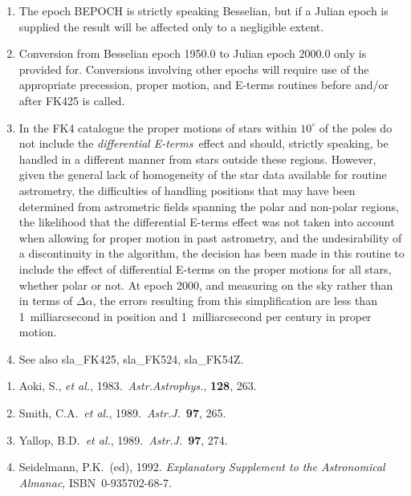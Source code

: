 {
 \begin{enumerate}
  \item The epoch BEPOCH is strictly speaking Besselian, but
        if a Julian epoch is supplied the result will be
        affected only to a negligible extent.
  \item Conversion from Besselian epoch 1950.0 to Julian epoch
        2000.0 only is provided for.  Conversions involving other
        epochs will require use of the appropriate precession,
        proper motion, and E-terms routines before and/or
        after FK425 is called.
  \item In the FK4 catalogue the proper motions of stars within
        $10^{\circ}$ of the poles do not include the {\it differential
        E-terms}\, effect and should, strictly speaking, be handled
        in a different manner from stars outside these regions.
        However, given the general lack of homogeneity of the star
        data available for routine astrometry, the difficulties of
        handling positions that may have been determined from
        astrometric fields spanning the polar and non-polar regions,
        the likelihood that the differential E-terms effect was not
        taken into account when allowing for proper motion in past
        astrometry, and the undesirability of a discontinuity in
        the algorithm, the decision has been made in this routine to
        include the effect of differential E-terms on the proper
        motions for all stars, whether polar or not.  At epoch 2000,
        and measuring on the sky rather than in terms of $\Delta\alpha$,
        the errors resulting from this simplification are less than
        1~milliarcsecond in position and 1~milliarcsecond per
        century in proper motion.
  \item See also sla\_FK425, sla\_FK524, sla\_FK54Z.
 \end{enumerate}
}
{
 \begin{enumerate}
  \item Aoki, S., {\it et al.}, 1983.\ {\it Astr.Astrophys.}, {\bf 128}, 263.
  \item Smith, C.A.\ {\it et al.}, 1989.\  {\it Astr.J.}\ {\bf 97}, 265.
  \item Yallop, B.D.\ {\it et al.}, 1989.\ {\it Astr.J.}\ {\bf 97}, 274.
  \item Seidelmann, P.K.\ (ed), 1992.  {\it Explanatory
        Supplement to the Astronomical Almanac}, ISBN~0-935702-68-7.
 \end{enumerate}
}
